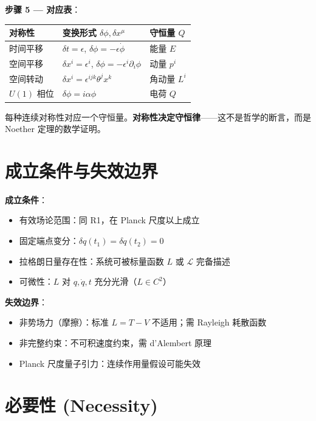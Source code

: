\textbf{步骤 5 — 对应表}：
\begin{center}
\footnotesize
\begin{tabular}{p{3cm}p{5.5cm}p{5.5cm}}
\toprule
\textbf{对称性} & \textbf{变换形式} $\delta\phi, \delta x^\mu$ & \textbf{守恒量} $Q$ \\
\midrule
时间平移 & $\delta t = \epsilon$, $\delta\phi = -\epsilon\dot{\phi}$ & 能量 $E$ \\
空间平移 & $\delta x^i = \epsilon^i$, $\delta\phi = -\epsilon^i\partial_i\phi$ & 动量 $p^i$ \\
空间转动 & $\delta x^i = \epsilon^{ijk}\theta^j x^k$ & 角动量 $L^i$ \\
$U(1)$ 相位 & $\delta\phi = i\alpha\phi$ & 电荷 $Q$ \\
\bottomrule
\end{tabular}
\end{center}
\fbox{[S]} 每种连续对称性对应一个守恒量。\textbf{对称性决定守恒律}——这不是哲学的断言，而是 Noether 定理的数学证明。

\section{成立条件与失效边界}

\begin{limitbox}[R2 的成立条件]
  \textbf{成立条件}：
  \begin{itemize}
    \item 有效场论范围：同 R1，在 Planck 尺度以上成立
    \item 固定端点变分：$\delta q(t_1) = \delta q(t_2) = 0$
    \item 拉格朗日量存在性：系统可被标量函数 $L$ 或 $\mathcal{L}$ 完备描述
    \item 可微性：$L$ 对 $q,\dot{q},t$ 充分光滑（$L \in C^2$）
  \end{itemize}

  \textbf{失效边界}：
  \begin{itemize}
    \item 非势场力（摩擦）：标准 $L = T - V$ 不适用；需 Rayleigh 耗散函数
    \item 非完整约束：不可积速度约束，需 d'Alembert 原理
    \item Planck 尺度量子引力：连续作用量假设可能失效
  \end{itemize}
\end{limitbox}

\section{必要性 (Necessity)}

